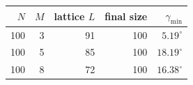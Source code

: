 \footnotesize
\setlength{\tabcolsep}{6pt}
\begin{tabular}{rrrrr}
\toprule
$N$ & $M$ & lattice $L$ & final size & $\gamma_{\min}$ \\
\midrule
100 & 3 & 91 & 100 & $5.19^\circ$ \\
100 & 5 & 85 & 100 & $18.19^\circ$ \\
100 & 8 & 72 & 100 & $16.38^\circ$ \\
\bottomrule
\end{tabular}
